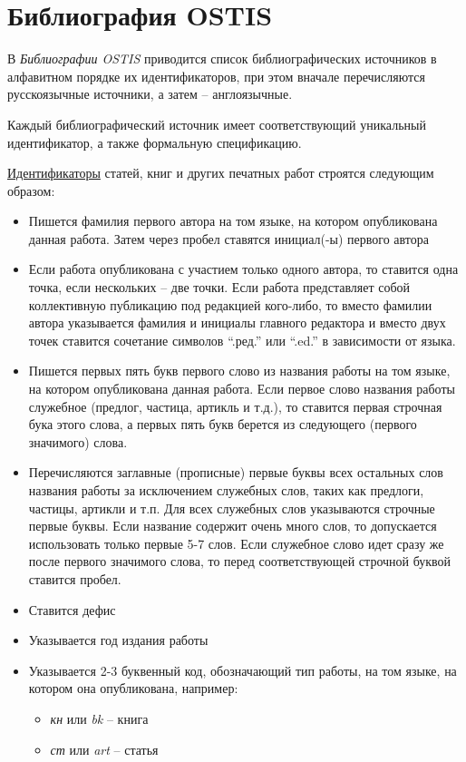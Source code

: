 

\chapter*{\LARGE Библиография OSTIS}
\label{chap_biblio}

В \textit{Библиографии OSTIS} приводится список библиографических источников в алфавитном порядке их идентификаторов, при этом вначале перечисляются русскоязычные источники, а затем -- англоязычные.

Каждый библиографический источник имеет соответствующий уникальный идентификатор, а также формальную спецификацию.

\underline{Идентификаторы} статей, книг и других печатных работ строятся следующим образом:

\begin{itemize}
	\item Пишется фамилия первого автора на том языке, на котором опубликована данная работа. Затем через пробел ставятся инициал(-ы) первого автора
	\item Если работа опубликована с участием только одного автора, то ставится одна точка, если нескольких -- две точки. Если работа представляет собой коллективную публикацию под редакцией кого-либо, то вместо фамилии автора указывается фамилия и инициалы главного редактора и вместо двух точек ставится сочетание символов ``.ред.'' или ``.ed.'' в зависимости от языка.
	\item Пишется первых пять букв первого слово из названия работы на том языке, на котором опубликована данная работа. Если первое слово названия работы служебное (предлог, частица, артикль и т.д.), то ставится первая строчная бука этого слова, а первых пять букв берется из следующего (первого значимого) слова.
	\item Перечисляются заглавные (прописные) первые буквы всех остальных слов названия работы за исключением служебных слов, таких как предлоги, частицы, артикли и т.п. Для всех служебных слов указываются строчные первые буквы. Если название содержит очень много слов, то допускается использовать только первые 5-7 слов. Если служебное слово идет сразу же после первого значимого слова, то перед соответствующей строчной буквой ставится пробел.
	\item Ставится дефис
	\item Указывается год издания работы
	\item Указывается 2-3 буквенный код, обозначающий тип работы, на том языке, на котором она опубликована, например:
	\begin{itemize}
		\item \textit{кн} или \textit{bk} -- книга
		\item \textit{ст} или \textit{art} -- статья
	\end{itemize}
\end{itemize}

